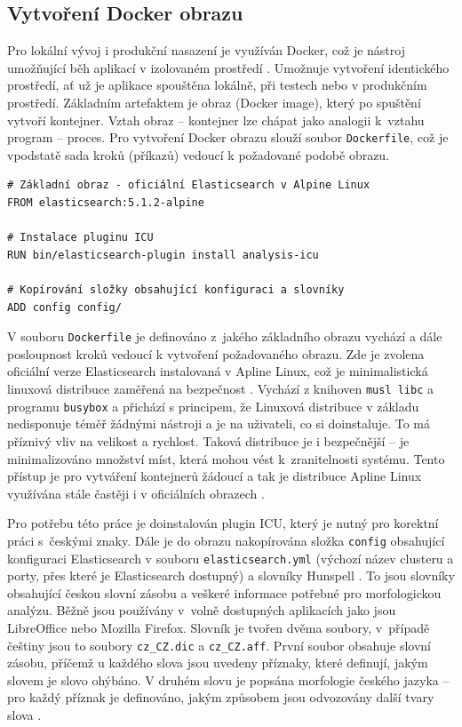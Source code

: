\documentclass[FM,DP]{tulthesis}
\newenvironment{code}
    {\filbreak\captionsetup{type=listing}}{\filbreak}
\begin{document}
\subsection{Vytvoření Docker obrazu}

Pro lokální vývoj i produkční nasazení
je využíván Docker, což je nástroj umožňující běh aplikací v izolovaném prostředí
\cite{docker}. Umožnuje vytvoření identického prostředí, ať už je aplikace spouštěna 
lokálně, při testech nebo v produkčním prostředí. Základním artefaktem je obraz (Docker
image), který po spuštění vytvoří kontejner. Vztah obraz -- kontejner lze chápat jako 
analogii k~vztahu program -- proces. Pro vytvoření Docker obrazu slouží soubor \verb|Dockerfile|,
což je vpodstatě sada kroků (příkazů) vedoucí k požadované podobě obrazu.

\begin{code}
\captionsetup{singlelinecheck=false,justification=raggedright}
\label{code:dockerfile}
\begin{verbatim}
# Základní obraz - oficiální Elasticsearch v Alpine Linux
FROM elasticsearch:5.1.2-alpine

# Instalace pluginu ICU
RUN bin/elasticsearch-plugin install analysis-icu

# Kopírování složky obsahující konfiguraci a slovníky
ADD config config/
\end{verbatim}
\end{code}

V souboru \verb|Dockerfile| je definováno z~jakého
základního obrazu vychází a dále posloupnost kroků vedoucí k vytvoření požadovaného obrazu.
Zde je zvolena oficiální verze Elasticsearch instalovaná v Apline Linux, což je minimalistická 
linuxová distribuce zaměřená na bezpečnost \cite{alpine}. Vychází z knihoven \verb|musl libc| 
a programu \verb|busybox| a přichází s principem, že Linuxová distribuce v základu
nedisponuje téměř žádnými nástroji a je na uživateli, co si doinstaluje. To má příznivý
vliv na velikost a rychlost. Taková distribuce je i bezpečnější -- je minimalizováno 
množství míst, která mohou vést k~zranitelnosti systému. Tento přístup je pro vytváření
kontejnerů žádoucí a tak je distribuce Apline Linux využívána stále častěji
i v oficiálních obrazech \cite{alpine-lean}.

Pro potřebu této práce je doinstalován plugin ICU, který je nutný pro korektní práci 
s~českými znaky. Dále je do obrazu nakopírována složka \verb|config| obsahující konfiguraci
Elasticsearch v souboru \verb|elasticsearch.yml| (výchozí název clusteru a porty, přes které 
je Elasticsearch dostupný) a slovníky Hunspell \cite{hunspell}. To jsou slovníky obsahující 
českou slovní zásobu a veškeré informace potřebné pro morfologickou analýzu. Běžně jsou používány 
v~volně dostupných aplikacích jako jsou LibreOffice \cite{hunspell-download} nebo Mozilla Firefox. 
Slovník je tvořen dvěma soubory, v~případě češtiny jsou to soubory \verb|cz_CZ.dic| a \verb|cz_CZ.aff|. 
První soubor obsahuje slovní zásobu, příčemž u každého slova jsou uvedeny příznaky, 
které definují, jakým slovem je slovo ohýbáno. V druhém slovu je popsána morfologie českého
jazyka -- pro každý příznak je definováno, jakým způsobem jsou odvozovány další tvary
slova \cite{hunspell-man}.
\end{document}
